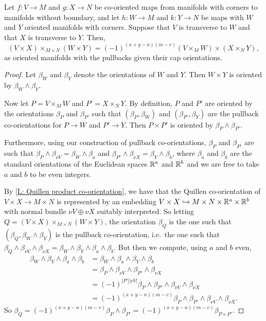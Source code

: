 \begin{proposition}\label{P: cap cross}
	Let $f \colon V \to M$ and $g:X \to N$ be co-oriented maps from manifolds with corners to manifolds without boundary, and let $h \colon W \to M$ and $k \colon Y \to N$ be maps with $W$ and $Y$ oriented manifolds with corners.
	Suppose that $V$ is transverse to $W$ and that $X$ is transverse to $Y$.
	Then,
	$$(V \times X)\times_{M \times N} (W \times Y) = (-1)^{(x+y-n)(m-v)} (V \times_M W) \times (X \times_N Y),$$
	as oriented manifolds with the pullbacks given their cap orientations.
\end{proposition}

\begin{proof}
	Let $\beta_W$ and $\beta_Y$ denote the orientations of $W$ and $Y$.
	Then $W \times Y$ is oriented by $\beta_W \wedge \beta_Y$.

	Now let $P = V \times_M W$ and $P' = X \times_N Y$.
	By definition, $P$ and $P'$ are oriented by the orientations $\beta_P$ and $\beta_{P'}$ such that $(\beta_P,\beta_W)$ and $(\beta_{P'},\beta_Y)$ are the pullback co-orientations for $P \to W$ and $P' \to Y$.
	Then $P \times P'$ is oriented by $\beta_P \wedge \beta_{P'}$.

	Furthermore, using our construction of pullback co-orientations, $\beta_P$ and $\beta_{P'}$ are such that $\beta_P \wedge \beta_{\nu V} = \beta_W \wedge \beta_a$ and $\beta_{P'} \wedge \beta_{\nu X} = \beta_Y \wedge \beta_b$, where $\beta_a$ and $\beta_b$ are the standard orientations of the Euclidean spaces $\mathbb{R}^a$ and $\mathbb{R}^b$ and we are free to take $a$ and $b$ to be even integers.

	By \cref{L: Quillen product co-orientation}, we have that the Quillen co-orientation of $V \times X \to M \times N$ is represented by an embedding $V \times X \hookrightarrow M \times N \times \mathbb{R}^a \times \mathbb{R}^b$ with normal bundle $\nu V \oplus \nu X$ suitably interpreted.
	So letting $Q = (V \times X)\times_{M \times N} (W \times Y)$, the orientation $\beta_Q$ is the one such that $(\beta_Q,\beta_W \wedge \beta_Y)$ is the pullback co-orientation, i.e.\ the one such that $\beta_Q \wedge \beta_{\nu V} \wedge \beta_{\nu X} = \beta_W \wedge \beta_Y \wedge \beta_a \wedge \beta_b$.
	But then we compute, using $a$ and $b$ even,
	\begin{align*}
		\beta_W \wedge \beta_Y \wedge \beta_a \wedge \beta_b& = \beta_W \wedge \beta_a \wedge \beta_Y \wedge \beta_b\\
		& = \beta_P \wedge \beta_{\nu V} \wedge \beta_{P'} \wedge \beta_{\nu X}\\
		& = (-1)^{|P'||\nu V|}\beta_P \wedge \beta_{P'} \wedge \beta_{\nu V} \wedge \beta_{\nu X}\\
		& = (-1)^{(x+y-n)(m-v)}\beta_P \wedge \beta_{P'} \wedge \beta_{\nu V} \wedge \beta_{\nu X}.
	\end{align*}
	So $\beta_Q = (-1)^{(x+y-n)(m-v)}\beta_P \wedge \beta_{P'} = (-1)^{(x+y-n)(m-v)}\beta_{P \times P'}$.
\end{proof}

